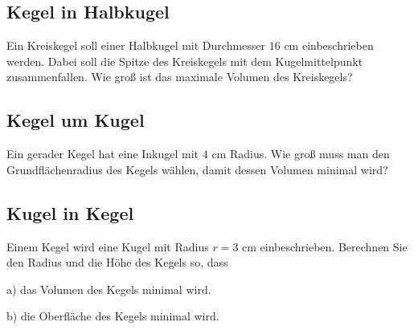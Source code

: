 \subsection{Kegel in Halbkugel}
Ein Kreiskegel soll einer Halbkugel mit Durchmesser $16 \text{ cm}$
einbeschrieben werden. Dabei soll die Spitze des Kreiskegels mit dem
Kugelmittelpunkt zusammenfallen. Wie groß ist das maximale Volumen des
Kreiskegels?




\subsection{Kegel um Kugel}

Ein gerader Kegel hat eine Inkugel mit $4 \text{ cm}$
Radius. Wie groß muss man den Grundflächenradius des Kegels wählen, damit dessen Volumen minimal wird?




\subsection{Kugel in Kegel}
Einem Kegel wird eine Kugel mit Radius $r = 3 \text{ cm}$
einbeschrieben. Berechnen Sie den Radius und die Höhe des Kegels so,
dass

a) das Volumen des Kegels minimal wird.

b) die Oberfläche des Kegels minimal wird.



